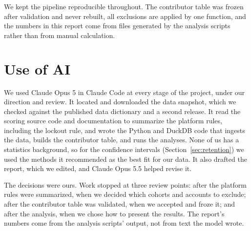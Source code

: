 \documentclass[sigconf,nonacm]{acmart}
\begin{document}
We kept the pipeline reproducible throughout. The contributor table was frozen after
validation and never rebuilt, all exclusions are applied by one function, and the numbers
in this report come from files generated by the analysis scripts rather than from manual
calculation.

\section{Use of AI}

We used Claude Opus 5 in Claude Code at every stage of the project, under our direction
and review. It located and downloaded the data snapshot, which we checked against the
published data dictionary and a second release. It read the scoring source code and
documentation to summarize the platform rules, including the lockout rule, and wrote the
Python and DuckDB code that ingests the data, builds the contributor table, and runs the
analyses. None of us has a statistics background, so for the confidence intervals
(Section~\ref{sec:retention}) we used the methods it recommended as the best fit for our
data. It also drafted the report, which we edited, and Claude Opus 5.5 helped revise
it.

The decisions were ours. Work stopped at three review points: after the platform rules
were summarized, when we decided which cohorts and accounts to exclude; after the
contributor table was validated, when we accepted and froze it; and after the analysis,
when we chose how to present the results. The report's numbers come from the analysis
scripts' output, not from text the model wrote.
\end{document}
